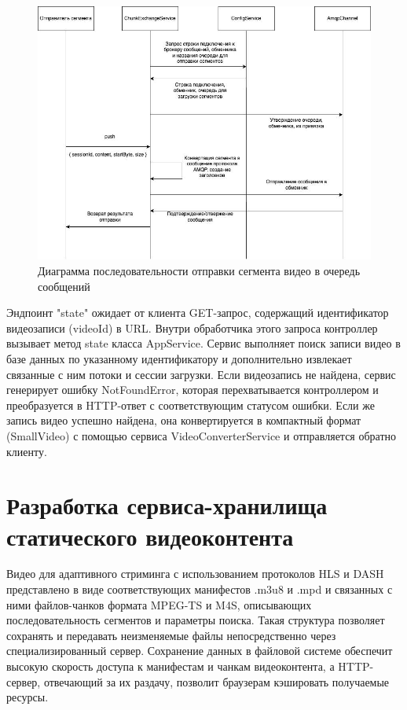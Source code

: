 	\begin{figure}[ht!] 
		\center
		\includegraphics [scale=0.4] {my_folder/images//queue_sending_processes}
		\caption{Диаграмма последовательности отправки сегмента видео в очередь сообщений} 
		\label{fig:queue_sending_processes}  
	\end{figure}

	Эндпоинт "state" ожидает от клиента GET-запрос, содержащий идентификатор видеозаписи (videoId) в URL. Внутри обработчика этого запроса контроллер вызывает метод state класса AppService. Сервис выполняет поиск записи видео в базе данных по указанному идентификатору и дополнительно извлекает связанные с ним потоки и сессии загрузки. Если видеозапись не найдена, сервис генерирует ошибку NotFoundError, которая перехватывается контроллером и преобразуется в HTTP-ответ с соответствующим статусом ошибки. Если же запись видео успешно найдена, она конвертируется в компактный формат (SmallVideo) с помощью сервиса VideoConverterService и отправляется обратно клиенту.

	\section{Разработка сервиса-хранилища статического видеоконтента}

	Видео для адаптивного стриминга с использованием протоколов HLS и DASH представлено в виде соответствующих манифестов .m3u8 и .mpd и связанных с ними файлов-чанков формата MPEG-TS и M4S, описывающих последовательность сегментов и параметры поиска. Такая структура позволяет сохранять и передавать неизменяемые файлы непосредственно через специализированный сервер. Сохранение данных в файловой системе обеспечит высокую скорость доступа к манифестам и чанкам видеоконтента, а HTTP-сервер, отвечающий за их раздачу, позволит браузерам кэшировать получаемые ресурсы.

